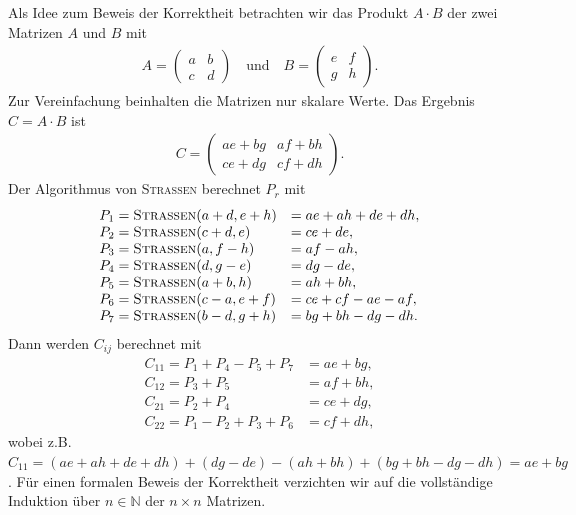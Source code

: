 \documentclass{scrartcl}
\numberwithin{equation}{section}
\begin{document}
Als Idee zum Beweis der Korrektheit betrachten wir das Produkt $A \cdot B$ der zwei Matrizen $A$ und $B$ mit
\begin{align*}
	A = \begin{pmatrix} a & b \\ c & d \end{pmatrix} \quad \text{und} \quad B = \begin{pmatrix} e & f \\ g & h \end{pmatrix}.
\end{align*}
Zur Vereinfachung beinhalten die Matrizen nur skalare Werte. Das Ergebnis $C = A \cdot B$ ist
\begin{align*}
	C = \begin{pmatrix} ae + bg & af + bh \\ ce + dg & cf + dh \end{pmatrix}.
\end{align*}
Der Algorithmus von \textsc{Strassen} berechnet $P_r$ mit
\[
\begin{array}{ll}
	P_1 = \textsc{Strassen}(a + d, e + h) & = ae + ah + de + dh, \\
	P_2 = \textsc{Strassen}(c + d, e)     & = ce + de, \\
	P_3 = \textsc{Strassen}(a, f - h)     & = af - ah, \\
	P_4 = \textsc{Strassen}(d, g - e)     & = dg - de, \\
	P_5 = \textsc{Strassen}(a + b, h)     & = ah + bh, \\
	P_6 = \textsc{Strassen}(c - a, e + f) & = ce + cf - ae - af, \\
	P_7 = \textsc{Strassen}(b - d, g + h) & = bg + bh - dg - dh.
\end{array}
\]
Dann werden $C_{ij}$ berechnet mit
\[
\begin{array}{ll}
	C_{11} = P_1 + P_4 - P_5 + P_7 & = ae + bg, \\
	C_{12} = P_3 + P_5 & = af + bh, \\
	C_{21} = P_2 + P_4 & = ce + dg, \\
	C_{22} = P_1 - P_2 + P_3 + P_6 & = cf + dh,
\end{array}
\]
wobei z.B. $ C_{11} = (ae + ah + de + dh) + (dg - de) - (ah + bh) + (bg + bh - dg - dh) = ae + bg$. Für einen formalen Beweis der Korrektheit verzichten wir auf die vollständige Induktion über $n \in \mathbb{N}$ der $n \times n$ Matrizen.
\end{document}

